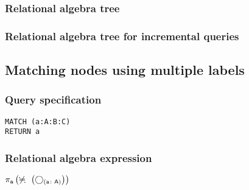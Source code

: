 \subsubsection*{Relational algebra tree}


\subsubsection*{Relational algebra tree for incremental queries}


\subsection{Matching nodes using multiple labels}

\subsubsection*{Query specification}

\begin{lstlisting}
MATCH (a:A:B:C)
RETURN a
\end{lstlisting}

\subsubsection*{Relational algebra expression}

$\projection{\var{a}} \left(\alldifferent{} \left(\getvertices{a}{A}\right)\right)$

